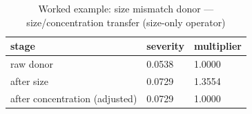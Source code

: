 \begin{table}[htbp]
\centering
\caption{Worked example: size mismatch donor --- size/concentration transfer (size-only operator)}
\label{tab:v1_we_size_mismatch}
\begin{tabular}{lll}
\toprule
\textbf{stage} & \textbf{severity} & \textbf{multiplier} \\
\midrule
raw donor & 0.0538 & 1.0000 \\
after size & 0.0729 & 1.3554 \\
after concentration (adjusted) & 0.0729 & 1.0000 \\
\bottomrule
\end{tabular}
\end{table}
